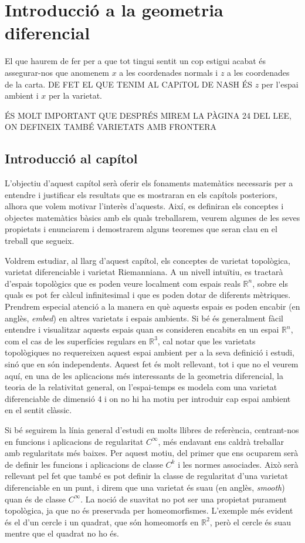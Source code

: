 \chapter{Introducció a la geometria diferencial}\label{cap:intro}

{\color{red} El que haurem de fer per a que tot tingui sentit un cop estigui acabat és assegurar-nos que anomenem $x$ a les coordenades normals i $z$ a les coordenades de la carta. DE FET EL QUE TENIM AL CAPíTOL DE NASH ÉS $z$ per l'espai ambient i $x$ per la varietat.}

{\color{red} ÉS MOLT IMPORTANT QUE DESPRÉS MIREM LA PÀGINA 24 DEL LEE, ON DEFINEIX TAMBÉ VARIETATS AMB FRONTERA}

\section{Introducció al capítol}
L'objectiu d'aquest capítol serà oferir els fonaments matemàtics necessaris per a entendre i justificar els resultats que es mostraran en els capítols posteriors, alhora que volem motivar l'interès d'aquests. Així, es definiran els conceptes i objectes matemàtics bàsics amb els quals treballarem, veurem algunes de les seves propietats i enunciarem i demostrarem alguns teoremes que seran clau en el treball que segueix.

Voldrem estudiar, al llarg d'aquest capítol, els conceptes de varietat topològica, varietat diferenciable i varietat Riemanniana. A un nivell intuïtiu, es tractarà d'espais topològics que es poden veure localment com espais reals $\mathbb R^n$, sobre els quals es pot fer càlcul infinitesimal i que es poden dotar de diferents mètriques. Prendrem especial atenció a la manera en què aquests espais es poden encabir (en anglès, \textit{embed}) en altres varietats i espais ambients. Si bé és generalment fàcil entendre i visualitzar aquests espais quan es consideren encabits en un espai $\mathbb R^n$, com el cas de les superfícies regulars en $\mathbb R^3$, cal notar que les varietats topològiques no requereixen aquest espai ambient per a la seva definició i estudi, sinó que en són independents. Aquest fet és molt rellevant, tot i que no el veurem aquí, en una de les aplicacions més interessants de la geometria diferencial, la teoria de la relativitat general, on l'espai-temps es modela com una varietat diferenciable de dimensió 4 i on no hi ha motiu per introduir cap espai ambient en el sentit clàssic.

Si bé seguirem la línia general d'estudi en molts llibres de referència, centrant-nos en funcions i aplicacions de regularitat $C^\infty$, més endavant ens caldrà treballar amb regularitats més baixes. Per aquest motiu, del primer que ens ocuparem serà de definir les funcions i aplicacions de classe $C^k$ i les normes associades. Això serà rellevant pel fet que també es pot definir la classe de regularitat d'una varietat diferenciable en un punt, i direm que una varietat és suau (en anglès, \textit{smooth}) quan és de classe $C^\infty$. La noció de suavitat no pot ser una propietat purament topològica, ja que no és preservada per homeomorfismes. L'exemple més evident és el d'un cercle i un quadrat, que són homeomorfs en $\mathbb R^2$, però el cercle és suau mentre que el quadrat no ho és. 

